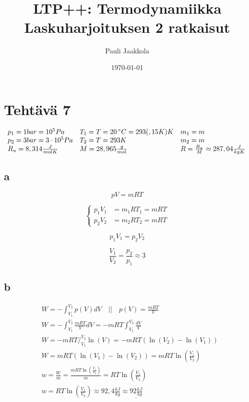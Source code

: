 \documentclass[12pt,a4paper,finnish]{article}
\title{LTP++: Termodynamiikka\\Laskuharjoituksen 2 ratkaisut}
\date{\today}
\author{Pauli Jaakkola}
\begin{document}
\maketitle
\tableofcontents
\newpage

\section{Tehtävä 7}

\begin{math}
 \begin{array}{l l l}
  p_1 = 1 bar = 10^5 Pa & T_1 = T = 20\,^\circ C = 293(,15 K) K & m_1 = m\\
  p_2 = 3 bar = 3\cdot 10^5 Pa & T_2 = T = 293K & m_2 = m\\
  R_u = 8,314 \frac{J}{molK} & M = 28,965 \frac{g}{mol} & R = \frac{R_u}{M} \approx 287,04 \frac{J}{kgK}
 \end{array}
\end{math}

\subsection{a}

\begin{equation}
 pV = mRT
\end{equation}

\begin{equation}
\left\{
\begin{aligned}
 p_1V_1 &= m_1RT_1 = mRT\\
 p_2V_2 &= m_2RT_2 = mRT
\end{aligned}\right.
\end{equation}

\begin{equation}
 p_1V_1 = p_2V_2
\end{equation}

\begin{equation}
 \frac{V_1}{V_2} = \frac{p_2}{p_1} \approx \underline{3}
\end{equation}

\subsection{b}

\begin{align}
 &W = -\int_{V_1}^{V_2}p(V)dV \quad\bigg|\bigg|\quad p(V) = \frac{mRT}{V}\\
 &W = -\int_{V_1}^{V_2}\frac{mRT}{V}dV = -mRT\int_{V_1}^{V_2}\frac{dV}{V}\\
 &W = -mRT\bigg/_{V_1}^{V_2}\ln(V) = -mRT(\ln(V_2) - \ln(V_1))\\
 &W = mRT(\ln(V_1) - \ln(V_2)) = mRT\ln\left(\frac{V_1}{V_2}\right)\\
 &w = \frac{W}{m} = \frac{mRT\ln\left(\frac{V_1}{V_2}\right)}{m} = RT\ln\left(\frac{V_1}{V_2}\right)\\
 &w = RT\ln\left(\frac{V_1}{V_2}\right) \approx 92,4\frac{kJ}{kg} \approx \underline{92\frac{kJ}{kg}}
\end{align}
\end{document}
